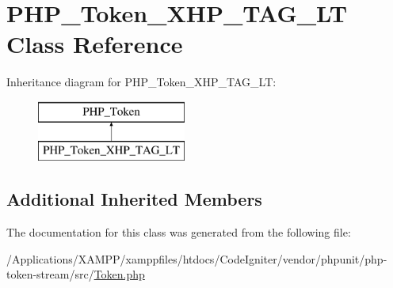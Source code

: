\hypertarget{class_p_h_p___token___x_h_p___t_a_g___l_t}{}\section{P\+H\+P\+\_\+\+Token\+\_\+\+X\+H\+P\+\_\+\+T\+A\+G\+\_\+\+LT Class Reference}
\label{class_p_h_p___token___x_h_p___t_a_g___l_t}
Inheritance diagram for P\+H\+P\+\_\+\+Token\+\_\+\+X\+H\+P\+\_\+\+T\+A\+G\+\_\+\+LT\+:\begin{figure}[H]
\begin{center}
\leavevmode
\includegraphics[height=2.000000cm]{class_p_h_p___token___x_h_p___t_a_g___l_t}
\end{center}
\end{figure}
\subsection*{Additional Inherited Members}


The documentation for this class was generated from the following file\+:\begin{DoxyCompactItemize}
\item 
/\+Applications/\+X\+A\+M\+P\+P/xamppfiles/htdocs/\+Code\+Igniter/vendor/phpunit/php-\/token-\/stream/src/\mbox{\hyperlink{_token_8php}{Token.\+php}}\end{DoxyCompactItemize}
